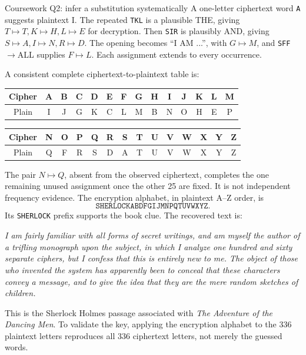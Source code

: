 \documentclass[11pt,a4paper]{article}
\begin{document}
\begin{example}{Coursework Q2: infer a substitution systematically}
A one-letter ciphertext word \texttt{A} suggests plaintext I. The repeated \texttt{TKL} is a plausible THE, giving \(T\mapsto T,K\mapsto H,L\mapsto E\) for decryption. Then \texttt{SIR} is plausibly AND, giving \(S\mapsto A,I\mapsto N,R\mapsto D\). The opening becomes ``I AM ...'', with \(G\mapsto M\), and \texttt{SFF}\(\to\)ALL supplies \(F\mapsto L\). Each assignment extends to every occurrence.

A consistent complete ciphertext-to-plaintext table is:
\begin{center}\scriptsize
\begin{tabular}{c|*{13}{c}}Cipher&A&B&C&D&E&F&G&H&I&J&K&L&M\\\hline Plain&I&J&G&K&C&L&M&B&N&O&H&E&P\\\end{tabular}

\begin{tabular}{c|*{13}{c}}Cipher&N&O&P&Q&R&S&T&U&V&W&X&Y&Z\\\hline Plain&Q&F&R&S&D&A&T&U&V&W&X&Y&Z\\\end{tabular}\normalsize\end{center}
The pair \(N\mapsto Q\), absent from the observed ciphertext, completes the one remaining unused assignment once the other 25 are fixed. It is not independent frequency evidence. The encryption alphabet, in plaintext A--Z order, is
\[\texttt{SHERLOCKABDFGIJMNPQTUVWXYZ}.\]
Its \texttt{SHERLOCK} prefix supports the book clue. The recovered text is:

\textit{I am fairly familiar with all forms of secret writings, and am myself the author of a trifling monograph upon the subject, in which I analyze one hundred and sixty separate ciphers, but I confess that this is entirely new to me. The object of those who invented the system has apparently been to conceal that these characters convey a message, and to give the idea that they are the mere random sketches of children.}

This is the Sherlock Holmes passage associated with \emph{The Adventure of the Dancing Men}. To validate the key, applying the encryption alphabet to the 336 plaintext letters reproduces all 336 ciphertext letters, not merely the guessed words.
\end{example}
\end{document}
